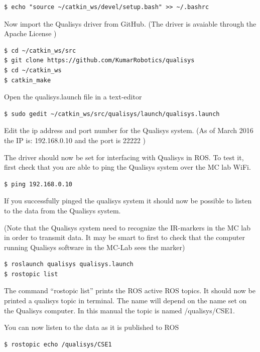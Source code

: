 \documentclass[a4paper,twoside,english]{report}
\begin{document}
\begin{verbatim}$ echo "source ~/catkin_ws/devel/setup.bash" >> ~/.bashrc\end{verbatim}

Now import the Qualisys driver from GitHub. (The driver \citep{KumarRobotics2016}
is avaiable through the Apache License )

\begin{verbatim}$ cd ~/catkin_ws/src
$ git clone https://github.com/KumarRobotics/qualisys
$ cd ~/catkin_ws
$ catkin_make\end{verbatim}

Open the qualisys.launch file in a text-editor

\begin{verbatim}$ sudo gedit ~/catkin_ws/src/qualisys/launch/qualisys.launch\end{verbatim}

Edit the ip address and port number for the Qualisys system. (As of
March 2016 the IP is: 192.168.0.10 and the port is 22222 )

The driver should now be set for interfacing with Qualisys in ROS.
To test it, first check that you are able to ping the Qualisys system
over the MC lab WiFi.

\begin{verbatim}$ ping 192.168.0.10\end{verbatim}

If you successfully pinged the qualisys system it should now be possible
to listen to the data from the Qualisys system.

(Note that the Qualisys system need to recognize the IR-markers in
the MC lab in order to transmit data. It may be smart to first to
check that the computer running Qualisys software in the MC-Lab sees
the marker)

\begin{verbatim}$ roslaunch qualisys qualisys.launch
$ rostopic list\end{verbatim}

The command ``rostopic list'' prints the ROS active ROS topics.
It should now be printed a qualisys topic in terminal. The name will
depend on the name set on the Qualisys computer. In this manual the
topic is named /qualisys/CSE1.

You can now listen to the data as it is published to ROS

\begin{verbatim}$ rostopic echo /qualisys/CSE1\end{verbatim}
\end{document}
